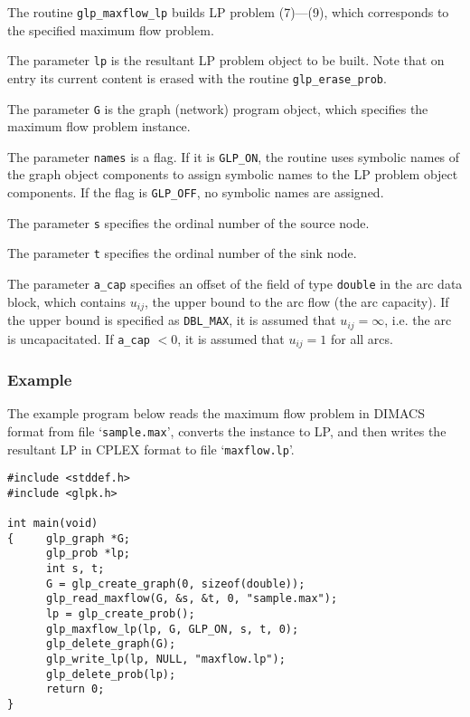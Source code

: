 \documentclass[dvipdfm,11pt]{report}
\begin{document}
The routine \verb|glp_maxflow_lp| builds LP problem (7)---(9), which
corresponds to the specified maximum flow problem.

The parameter \verb|lp| is the resultant LP problem object to be built.
Note that on entry its current content is erased with the routine
\verb|glp_erase_prob|.

The parameter \verb|G| is the graph (network) program object, which
specifies the maximum flow problem instance.

The parameter \verb|names| is a flag. If it is \verb|GLP_ON|, the
routine uses symbolic names of the graph object components to assign
symbolic names to the LP problem object components. If the flag is
\verb|GLP_OFF|, no symbolic names are assigned.

The parameter \verb|s| specifies the ordinal number of the source node.

The parameter \verb|t| specifies the ordinal number of the sink node.

The parameter \verb|a_cap| specifies an offset of the field of type
\verb|double| in the arc data block, which contains $u_{ij}$, the upper
bound to the arc flow (the arc capacity). If the upper bound is
specified as \verb|DBL_MAX|, it is assumed that $u_{ij}=\infty$, i.e.
the arc is uncapacitated. If \verb|a_cap| $<0$, it is assumed that
$u_{ij}=1$ for all arcs.

\subsubsection*{Example}

The example program below reads the maximum flow problem in DIMACS
format from file `\verb|sample.max|', converts the instance to LP, and
then writes the resultant LP in CPLEX format to file
`\verb|maxflow.lp|'.

\begin{footnotesize}
\begin{verbatim}
#include <stddef.h>
#include <glpk.h>

int main(void)
{     glp_graph *G;
      glp_prob *lp;
      int s, t;
      G = glp_create_graph(0, sizeof(double));
      glp_read_maxflow(G, &s, &t, 0, "sample.max");
      lp = glp_create_prob();
      glp_maxflow_lp(lp, G, GLP_ON, s, t, 0);
      glp_delete_graph(G);
      glp_write_lp(lp, NULL, "maxflow.lp");
      glp_delete_prob(lp);
      return 0;
}
\end{verbatim}
\end{footnotesize}
\end{document}
